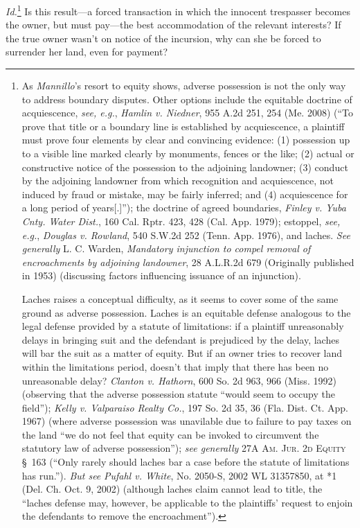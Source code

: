 \textit{Id.}\footnote{As \textit{Mannillo}'s resort to equity shows, adverse
possession is not the only way to address boundary disputes. Other options
include the equitable doctrine of acquiescence, \textit{see, e.g.}, \emph{Hamlin
v. Niedner}, 955 A.2d 251, 254 (Me. 2008) (``To prove that title or a boundary
line
is established by acquiescence, a plaintiff must prove four elements by clear
and convincing evidence: (1) possession up to a visible line marked clearly by
monuments, fences or the like; (2) actual or constructive notice of the
possession to the adjoining landowner; (3) conduct by the adjoining landowner
from which recognition and acquiescence, not induced by fraud or mistake, may
be fairly inferred; and (4) acquiescence for a long period of years[.]''); the
doctrine of agreed boundaries, \emph{Finley v. Yuba Cnty. Water Dist.}, 160 Cal. Rptr.
423, 428 (Cal. App. 1979); estoppel, \textit{see, e.g.}, \emph{Douglas v. Rowland},
540 S.W.2d 252 (Tenn. App. 1976), and laches. \textit{See generally} L. C.
Warden, \textit{Mandatory injunction to compel removal of encroachments by
adjoining landowner}, 28 A.L.R.2d 679 (Originally published in 1953)
(discussing factors influencing issuance of an injunction).\par Laches raises a
conceptual difficulty, as it seems to cover some of the same ground as adverse
possession. Laches is an equitable defense analogous to the legal defense
provided by a statute of limitations: if a plaintiff unreasonably delays in
bringing suit and the defendant is prejudiced by the delay, laches will bar the
suit as a matter of equity. But if an owner tries to recover land within the
limitations period, doesn't that imply that there has been no unreasonable
delay? \emph{Clanton v. Hathorn}, 600 So. 2d 963, 966 (Miss. 1992) (observing that the
adverse possession statute ``would seem to occupy the field''); \emph{Kelly v.
Valparaiso Realty Co.}, 197 So. 2d 35, 36 (Fla. Dist. Ct. App. 1967) (where
adverse possession was unavilable due to failure to pay taxes on the land ``we
do not feel that equity can be invoked to circumvent the statutory law of
adverse possession''); \textit{see generally} 27A \textsc{Am. Jur. 2d Equity}
\S~163
(``Only rarely should laches bar a case before the statute of limitations has
run.''). \textit{But see} \emph{Pufahl v. White}, No. 2050-S, 2002 WL 31357850,
at *1
(Del. Ch. Oct. 9, 2002) (although laches claim cannot lead to title, the
``laches defense may, however, be applicable to the plaintiffs' request to
enjoin the defendants to remove the encroachment'').} Is this result---a forced
transaction in which the innocent trespasser becomes the owner, but must
pay---the best accommodation of the relevant interests? If the true owner
wasn't on notice of the incursion, why can she be forced to surrender her land,
even for payment?  


